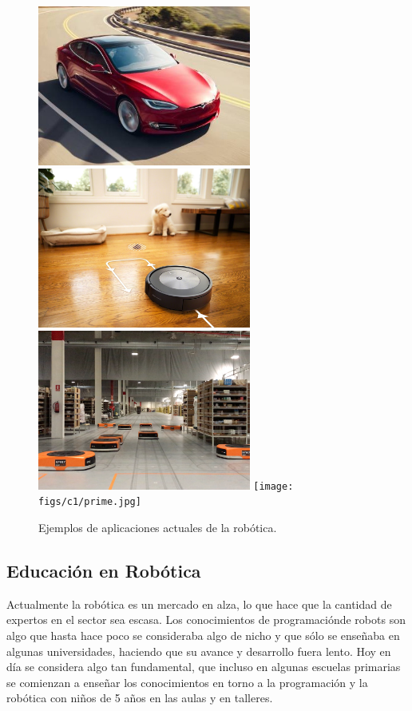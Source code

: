 \begin{figure} [H]
  \begin{center}
    \includegraphics[width=7cm]{figs/c1/tesla-model-s-5_750x.jpg}
    \includegraphics[width=7cm]{figs/c1/roomba.jpg}
    \includegraphics[width=7cm]{figs/c1/almacen.png}
    \texttt{[image: figs/c1/prime.jpg]}
  \end{center}
  \caption[Ejemplos aplicaciones actuales robótica]{Ejemplos de aplicaciones actuales de la robótica.}
  \label{fig:rob_varios}
\end{figure}

\subsection{Educación en Robótica}
\label{subsec:urjc}

Actualmente la robótica es un mercado en alza, lo que hace que la cantidad de expertos en el sector sea escasa.
Los conocimientos de programaciónde robots son algo que hasta hace poco se consideraba algo de nicho y que sólo se enseñaba en algunas universidades, haciendo que
su avance y desarrollo fuera lento. Hoy en día se considera algo tan fundamental, que incluso en algunas escuelas primarias se comienzan a enseñar los
conocimientos en torno a la programación y la robótica con niños de 5 años en las aulas y en talleres.\\

